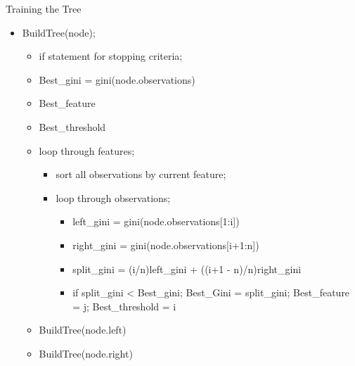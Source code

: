 \documentclass[xcolor={svgnames},
               hyperref={colorlinks,citecolor=DeepPink4,linkcolor=FireBrick,urlcolor=Maroon}]
               {beamer}
\begin{document}
  \begin{frame}{Training the Tree}
  \begin{itemize}
     \item BuildTree(node);
     \begin{itemize}
       \item if statement for stopping criteria;
       \item Best\_gini = gini(node.observations)
       \item Best\_feature
       \item Best\_threshold
       \item loop through features;
       \begin{itemize}
         \item sort all observations by current feature;
         \item loop through observations;
         \begin{itemize}
           \item left\_gini = gini(node.observations[1:i])
           \item right\_gini = gini(node.observations[i+1:n])
           \item split\_gini = (i/n)left\_gini + ((i+1 - n)/n)right\_gini
           \item if split\_gini < Best\_gini; Best\_Gini = split\_gini; Best\_feature = j; Best\_threshold = i
         \end{itemize}  
       \end{itemize}
       \item BuildTree(node.left)
       \item BuildTree(node.right)
      \end{itemize}
    \end{itemize}
  \end{frame}
\end{document}

